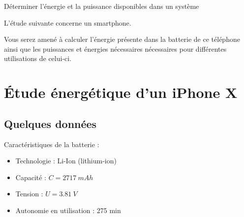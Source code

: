 \documentclass[10pt,fleqn]{article} %
\begin{document}

\begin{obj}
Déterminer l’énergie et la puissance disponibles dans un système

L’étude suivante concerne un smartphone.

Vous serez amené à
 calculer l’énergie présente dans la batterie de ce téléphone ainsi que les puissances et énergies nécessaires
 nécessaires pour différentes utilisations de celui-ci.

\end{obj}
\section{Étude énergétique d'un iPhone X}
\subsection{Quelques données}
Caractéristiques de la batterie :
\begin{itemize}
 \item Technologie : Li-Ion (lithium-ion)
\item Capacité : $ C = \SI{2717}{mAh} $
\item Tension : $U=\SI{3.81}{V}$
\item Autonomie en utilisation : 275 min
\end{itemize}
\end{document}

